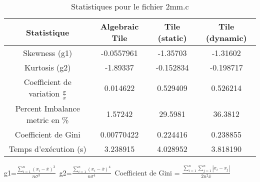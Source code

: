 \documentclass{article}
\begin{document}
\begin{table}[htbp]
  \centering
  \caption{Statistiques pour le fichier 2mm.c}
  \begin{tabular}{|c|c|c|c|}
    \hline
    Statistique & Algebraic Tile & Tile (static) & Tile (dynamic) \\ 
    \hline
    Skewness (g1)  & -0.0557961 & -1.35703 & -1.31602 \\ 
    Kurtosis (g2)  & -1.89337 & -0.152834 & -0.198717 \\ 
    Coefficient de variation $ \frac{\sigma}{\overline{x}} $ & 0.014622 & 0.529409 & 0.526214\\ 
    Percent Imbalance metric en \% & 1.57242 & 29.5981 & 36.3812\\ 
    Coefficient de Gini  & 0.00770422 & 0.224416 & 0.238855\\ 
    Temps d'exécution (s) &  3.238915    &  4.028952   &  3.818190   \\ 

    \hline
  \end{tabular}
\end{table}
g1=$ \frac{\sum_{i=1}^{n} (x_i - \overline{x})^3}{n\sigma^3} $\
g2=$ \frac{\sum_{i=1}^{n} (x_i - \overline{x})^4}{n\sigma^4} $\
Coefficient de Gini = $ \frac{\sum_{i=1}^{n}\sum_{j=1}^{n} |x_i - x_j|}{2n^2\overline{x}} $\
\newpage
\end{document}
